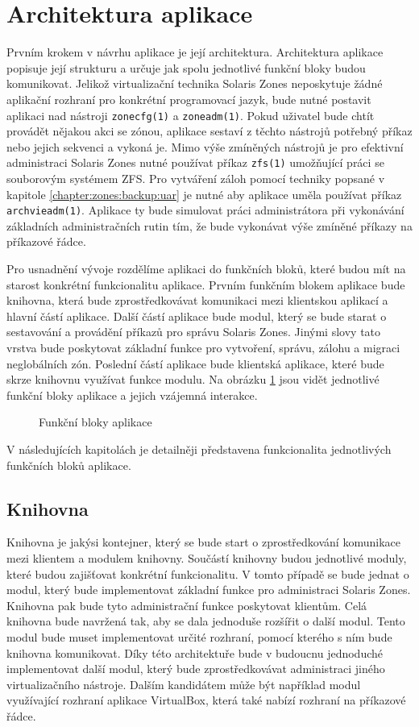 \section{Architektura aplikace}
\label{chapter:design:architecture}
Prvním krokem v návrhu aplikace je její architektura. Architektura aplikace popisuje její strukturu a určuje jak spolu jednotlivé
funkční bloky budou komunikovat. Jelikož virtualizační technika Solaris Zones neposkytuje žádné aplikační rozhraní pro konkrétní
programovací jazyk, bude nutné postavit aplikaci nad nástroji \verb|zonecfg(1)| a \verb|zoneadm(1)|. Pokud uživatel bude chtít
provádět nějakou akci se zónou, aplikace sestaví z těchto nástrojů potřebný příkaz nebo jejich sekvenci a vykoná je. Mimo výše
zmíněných nástrojů je pro efektivní administraci Solaris Zones nutné používat příkaz \verb|zfs(1)| umožňující práci se souborovým
systémem ZFS. Pro vytváření záloh pomocí techniky popsané v kapitole \ref{chapter:zones:backup:uar} je nutné aby aplikace uměla
používat příkaz \verb|archvieadm(1)|. Aplikace ty bude simulovat práci administrátora při vykonávání základních administračních
rutin tím, že bude vykonávat výše zmíněné příkazy na příkazové řádce.

Pro usnadnění vývoje rozdělíme aplikaci do funkčních bloků, které budou mít na starost konkrétní funkcionalitu aplikace. Prvním
funkčním blokem aplikace bude knihovna, která bude zprostředkovávat komunikaci mezi klientskou aplikací a hlavní částí aplikace.
Další částí aplikace bude modul, který se bude starat o sestavování a provádění příkazů pro správu Solaris Zones. Jinými slovy
tato vrstva bude poskytovat základní funkce pro vytvoření, správu, zálohu a migraci neglobálních zón. Poslední částí aplikace
bude klientská aplikace, které bude skrze knihovnu využívat funkce modulu. Na obrázku \ref{image:architecture} jsou vidět 
jednotlivé funkční bloky aplikace a jejich vzájemná interakce.
\begin{figure}
    \centering    
    \caption{Funkční bloky aplikace}
    \label{image:architecture}
\end{figure}
V následujících kapitolách je detailněji představena funkcionalita jednotlivých funkčních bloků aplikace.
\subsection{Knihovna}
\label{chapter:design:architecture:library}
Knihovna je jakýsi kontejner, který se bude start o zprostředkování komunikace mezi klientem a modulem knihovny. Součástí
knihovny budou jednotlivé moduly, které budou zajišťovat konkrétní funkcionalitu. V tomto případě se bude jednat o modul, který
bude implementovat základní funkce pro administraci Solaris Zones. Knihovna pak bude tyto administrační funkce poskytovat klientům.
Celá knihovna bude navržená tak, aby se dala jednoduše rozšířit o další modul. Tento modul bude muset implementovat určité
rozhraní, pomocí kterého s ním bude knihovna komunikovat. Díky této architektuře bude v budoucnu jednoduché implementovat
další modul, který bude zprostředkovávat administraci jiného virtualizačního nástroje. Dalším kandidátem může být například
modul využívající rozhraní aplikace VirtualBox, která také nabízí rozhraní na příkazové řádce.

